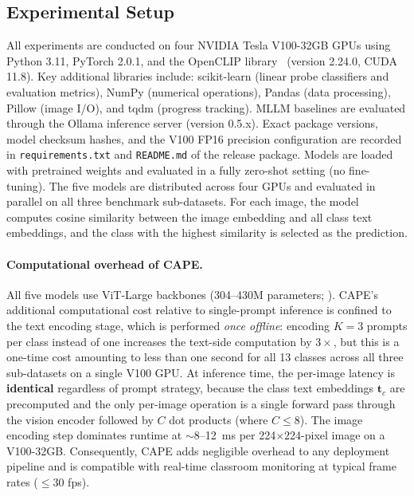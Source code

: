 \documentclass[symmetry,article,submit,pdftex,moreauthors]{Definitions/mdpi}
\begin{document}
\subsection{Experimental Setup}

All experiments are conducted on four NVIDIA Tesla V100-32GB GPUs using Python 3.11, PyTorch 2.0.1, and the OpenCLIP library~\cite{cherti2023reproducible} (version 2.24.0, CUDA 11.8). Key additional libraries include: scikit-learn (linear probe classifiers and evaluation metrics), NumPy (numerical operations), Pandas (data processing), Pillow (image I/O), and tqdm (progress tracking). MLLM baselines are evaluated through the Ollama inference server (version 0.5.x). Exact package versions, model checksum hashes, and the V100 FP16 precision configuration are recorded in \texttt{requirements.txt} and \texttt{README.md} of the release package.
Models are loaded with pretrained weights and evaluated in a fully zero-shot setting (no fine-tuning).
The five models are distributed across four GPUs and evaluated in parallel on all three benchmark sub-datasets.
For each image, the model computes cosine similarity between the image embedding and all class text embeddings, and the class with the highest similarity is selected as the prediction.

\paragraph{Computational overhead of CAPE.}
All five models use ViT-Large backbones (304--430M parameters; ). CAPE's additional computational cost relative to single-prompt inference is confined to the text encoding stage, which is performed \emph{once offline}: encoding $K\!=\!3$ prompts per class instead of one increases the text-side computation by $3\times$, but this is a one-time cost amounting to less than one second for all 13 classes across all three sub-datasets on a single V100 GPU. At inference time, the per-image latency is \textbf{identical} regardless of prompt strategy, because the class text embeddings $\mathbf{t}_c$ are precomputed and the only per-image operation is a single forward pass through the vision encoder followed by $C$ dot products (where $C \leq 8$). The image encoding step dominates runtime at $\sim$8--12~ms per 224$\times$224-pixel image on a V100-32GB. Consequently, CAPE adds negligible overhead to any deployment pipeline and is compatible with real-time classroom monitoring at typical frame rates ($\leq$30 fps).
\end{document}
